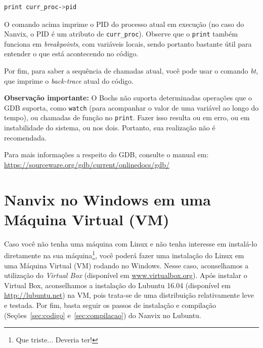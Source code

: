 \documentclass[11pt]{article}
\begin{document}
\begin{lstlisting}[language=sh,numbers=none,frame=single]
print curr_proc->pid
\end{lstlisting}

O comando acima imprime o PID do processo atual em execução (no caso do Nanvix, o PID é um atributo de \texttt{curr\_proc}). Observe que o \texttt{print} também funciona em \textit{breakpoints}, com variáveis locais, sendo portanto bastante útil para entender o que está acontecendo no código.

Por fim, para saber a sequência de chamadas atual, você pode usar o comando \textit{bt}, que imprime o \textit{back-trace} atual do código.

\textbf{Observação importante:} O Bochs não suporta determinadas operações que o GDB suporta, como \texttt{watch} (para acompanhar o valor de uma variável ao longo do tempo), ou chamadas de função no \texttt{print}. Fazer isso resulta ou em erro, ou em instabilidade do sistema, ou nos dois. Portanto, sua realização não é recomendada. 

Para mais informações a respeito do GDB, consulte o manual em: \url{https://sourceware.org/gdb/current/onlinedocs/gdb/}

\section{Nanvix no Windows em uma Máquina Virtual (VM)}
\label{sec:vm}

Caso você não tenha uma máquina com Linux e não tenha interesse em instalá-lo diretamente na sua máquina\footnote{Que triste... Deveria ter!}, você poderá fazer uma instalação do Linux em uma Máquina Virtual (VM) rodando no Windows. Nesse caso, aconselhamos a utilização do \textit{Virtual Box}
(disponível em \url{www.virtualbox.org}). Após instalar o Virtual Box, aconselhamos a instalação do Lubuntu 16.04 (disponível em \url{http://lubuntu.net}) na VM, pois trata-se de uma distribuição relativamente leve e testada. Por fim, basta seguir os passos de instalação e compilação (Seções~\ref{sec:codigo} e~\ref{sec:compilacao}) do Nanvix no Lubuntu.
\end{document}
